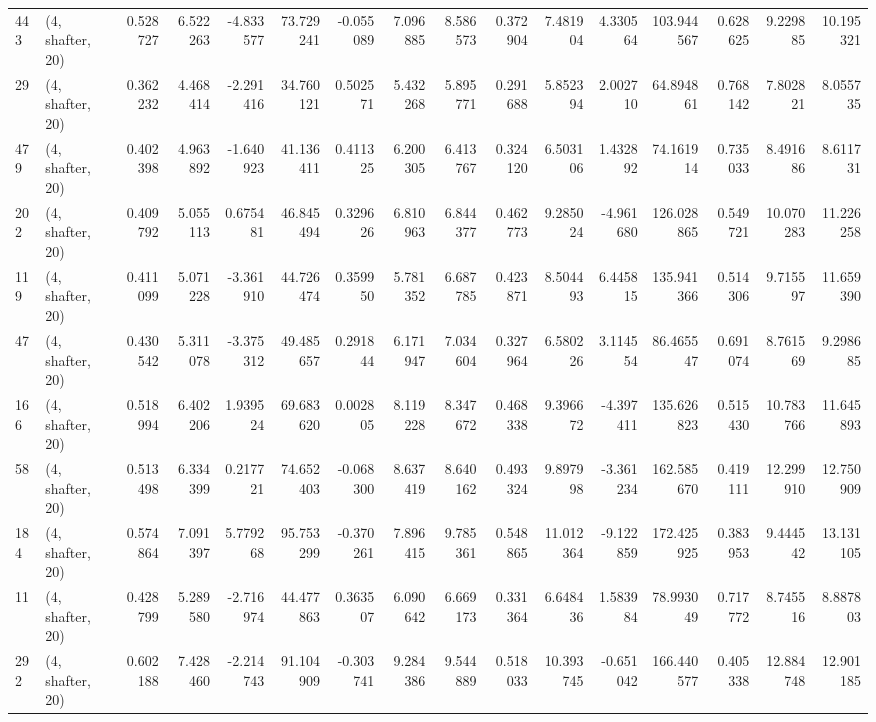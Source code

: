 \begin{tabular}{llrrrrrrrrrrrrrr}
443 &  (4, shafter, 20) &   0.528727 &   6.522263 &  -4.833577 &    73.729241 &  -0.055089 &   7.096885 &   8.586573 &  0.372904 &   7.481904 &   4.330564 &   103.944567 &   0.628625 &   9.229885 &  10.195321 \\
29  &  (4, shafter, 20) &   0.362232 &   4.468414 &  -2.291416 &    34.760121 &   0.502571 &   5.432268 &   5.895771 &  0.291688 &   5.852394 &   2.002710 &    64.894861 &   0.768142 &   7.802821 &   8.055735 \\
479 &  (4, shafter, 20) &   0.402398 &   4.963892 &  -1.640923 &    41.136411 &   0.411325 &   6.200305 &   6.413767 &  0.324120 &   6.503106 &   1.432892 &    74.161914 &   0.735033 &   8.491686 &   8.611731 \\
202 &  (4, shafter, 20) &   0.409792 &   5.055113 &   0.675481 &    46.845494 &   0.329626 &   6.810963 &   6.844377 &  0.462773 &   9.285024 &  -4.961680 &   126.028865 &   0.549721 &  10.070283 &  11.226258 \\
119 &  (4, shafter, 20) &   0.411099 &   5.071228 &  -3.361910 &    44.726474 &   0.359950 &   5.781352 &   6.687785 &  0.423871 &   8.504493 &   6.445815 &   135.941366 &   0.514306 &   9.715597 &  11.659390 \\
47  &  (4, shafter, 20) &   0.430542 &   5.311078 &  -3.375312 &    49.485657 &   0.291844 &   6.171947 &   7.034604 &  0.327964 &   6.580226 &   3.114554 &    86.465547 &   0.691074 &   8.761569 &   9.298685 \\
166 &  (4, shafter, 20) &   0.518994 &   6.402206 &   1.939524 &    69.683620 &   0.002805 &   8.119228 &   8.347672 &  0.468338 &   9.396672 &  -4.397411 &   135.626823 &   0.515430 &  10.783766 &  11.645893 \\
58  &  (4, shafter, 20) &   0.513498 &   6.334399 &   0.217721 &    74.652403 &  -0.068300 &   8.637419 &   8.640162 &  0.493324 &   9.897998 &  -3.361234 &   162.585670 &   0.419111 &  12.299910 &  12.750909 \\
184 &  (4, shafter, 20) &   0.574864 &   7.091397 &   5.779268 &    95.753299 &  -0.370261 &   7.896415 &   9.785361 &  0.548865 &  11.012364 &  -9.122859 &   172.425925 &   0.383953 &   9.444542 &  13.131105 \\
11  &  (4, shafter, 20) &   0.428799 &   5.289580 &  -2.716974 &    44.477863 &   0.363507 &   6.090642 &   6.669173 &  0.331364 &   6.648436 &   1.583984 &    78.993049 &   0.717772 &   8.745516 &   8.887803 \\
292 &  (4, shafter, 20) &   0.602188 &   7.428460 &  -2.214743 &    91.104909 &  -0.303741 &   9.284386 &   9.544889 &  0.518033 &  10.393745 &  -0.651042 &   166.440577 &   0.405338 &  12.884748 &  12.901185 \\

\end{tabular}
